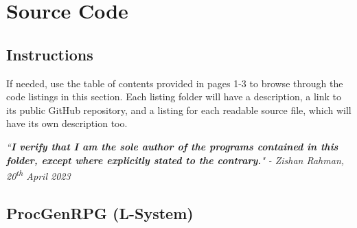 \chapter{Source Code} \label{Code}

\section{Instructions}



If needed, use the table of contents provided in pages 1-3 to browse through the code listings in this section. Each listing folder will have a description, a link to its public GitHub repository, and a listing for each readable source file, which will have its own description too.

\textit{``\textbf{I verify that I am the sole author of the programs contained in this folder, except where explicitly stated to the contrary.}"}
\textit{- Zishan Rahman, 20\textsuperscript{th} April 2023}

\section{ProcGenRPG (L-System)}

